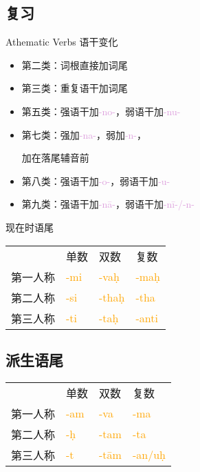 \documentclass[17pt]{beamer}
\newcommand{\wordending}[1]{\textcolor{Orange}{\nobreakdash-#1}}
\newcommand{\pratyaya}[1]{\textcolor{Plum}{#1}}
\begin{document}
\subsection{复习}
\begin{frame}{Athematic Verbs  语干变化}
  \small
  \raggedright
  \begin{itemize}
    \item 第二类：词根直接加词尾
    \item 第三类：重复语干加词尾
    \item 第五类：强语干加\pratyaya{\nobreakdash-no\nobreakdash-}，弱语干加\pratyaya{\nobreakdash-nu\nobreakdash-}
    \item 第七类：强加\pratyaya{\nobreakdash-na\nobreakdash-}，弱加\pratyaya{\nobreakdash-n\nobreakdash-}，
    
    \hspace*{4em}加在落尾辅音前
    \item 第八类：强语干加\pratyaya{\nobreakdash-o\nobreakdash-}，弱语干加\pratyaya{\nobreakdash-u\nobreakdash-}
    \item 第九类：强语干加\pratyaya{\nobreakdash-nā\nobreakdash-}，弱语干加\pratyaya{\nobreakdash-nī\nobreakdash-/\nobreakdash-n\nobreakdash-}
  \end{itemize}
\end{frame}

\begin{frame}{现在时语尾}
  \centering
  \begin{tabular}{@{}llll@{}} %
    & 单数  & 双数  & 复数 \\
    第一人称 & \wordending{mi} & \wordending{vaḥ}  & \wordending{maḥ}  \\
    第二人称 & \wordending{si} & \wordending{thaḥ} & \wordending{tha}  \\
    第三人称 & \wordending{ti} & \wordending{taḥ} & \cellcolor{green!20}\wordending{anti} \\
  \end{tabular}   
\end{frame}

\subsection{派生语尾}
\begin{frame}{\insertsubsection}
  \centering
  \begin{tabular}{@{}llll@{}} %
    & 单数  & 双数  & 复数 \\
    第一人称 & \cellcolor{green!20}\wordending{am} & \wordending{va}  & \wordending{ma}  \\
    第二人称 & \cellcolor{yellow!30}\wordending{ḥ} & \wordending{tam} & \wordending{ta}  \\
    第三人称 & \cellcolor{yellow!30}\wordending{t} & \wordending{tām} & \cellcolor{green!20}\wordending{an/uḥ}  \\
  \end{tabular}   
\end{frame}
\end{document}
